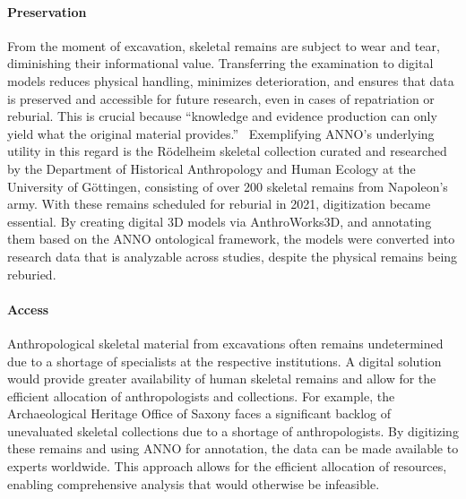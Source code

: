 \documentclass[sw]{iosart2x}
\begin{document}
\paragraph{Preservation}\label{sec:preserve}
From the moment of excavation, skeletal remains are subject to wear and tear, diminishing their informational value.
Transferring the examination to digital models reduces physical handling, minimizes deterioration, and ensures that data is preserved and accessible for future research, even in cases of repatriation or reburial.
This is crucial because \enquote{knowledge and evidence production can only yield what the original material provides.}~\cite[p.~132]{HeuschkelSchmiedelLabudde2024}
Exemplifying ANNO's underlying utility in this regard is the Rödelheim skeletal collection curated and researched by the Department of Historical Anthropology and Human Ecology at the University of Göttingen, consisting of over 200 skeletal remains from Napoleon's army.
With these remains scheduled for reburial in 2021, digitization became essential.
By creating digital 3D models via AnthroWorks3D, and annotating them based on the ANNO ontological framework, the models were converted into research data that is analyzable across studies, despite the physical remains being reburied.

\paragraph{Access}\label{sec:access}
Anthropological skeletal material from excavations often remains undetermined due to a shortage of specialists at the respective institutions.
A digital solution would provide greater availability of human skeletal remains and allow for the efficient allocation of anthropologists and collections.
For example, the Archaeological Heritage Office of Saxony faces a significant backlog of unevaluated skeletal collections due to a shortage of anthropologists.
By digitizing these remains and using ANNO for annotation, the data can be made available to experts worldwide.
This approach allows for the efficient allocation of resources, enabling comprehensive analysis that would otherwise be infeasible.
\end{document}
